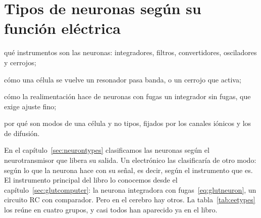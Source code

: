 \chapter{Tipos de neuronas según su función eléctrica}
\label{sec:eetypes}
\begin{chaptergoals}
\item qué instrumentos son las neuronas: integradores, filtros, convertidores, osciladores y cerrojos;
\item cómo una célula se vuelve un resonador pasa banda, o un cerrojo que  activa;
\item cómo la realimentación hace de neuronas con fugas un integrador sin fugas, que exige ajuste fino;
\item por qué son modos de una célula y no tipos, fijados por los canales iónicos y los de difusión.
\end{chaptergoals}

En el capítulo~\ref{sec:neurontypes} clasificamos las neuronas según el neurotransmisor que libera su salida. Un electrónico las clasificaría de otro modo: según lo que la neurona hace con su señal, es decir, según el instrumento que es. El instrumento principal del libro lo conocemos desde el capítulo~\ref{sec:glutcomputer}: la neurona integradora con fugas~\eqref{eq:glutneuron}, un circuito RC con comparador. Pero en el cerebro hay otros. La tabla~\ref{tab:eetypes} los reúne en cuatro grupos, y casi todos han aparecido ya en el libro.


